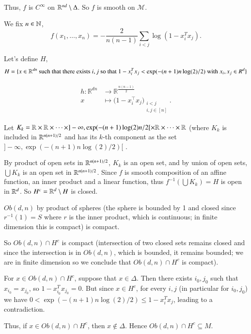 \documentclass{article}
\begin{document}
Thus, \( f \) is \( C^\infty \) on \( \mathbb{R}^{nd} \setminus \Delta \). So \( f \) is smooth on $\mathcal{M}$.

We fix \( n \in \mathbb{N} \),
\[
f(x_1, \ldots, x_n) = -\frac{2}{n(n-1)} \sum_{i<j} \log(1-x_i^T x_j).
\]

Let's define \( H \),
\[
H = \{x \in \R^{dn} \text{ such that there exists } i,j \text{ so that } 1-x_i^T x_j < \exp(-(n+1)n\log(2)/2)\ \text{with $x_i, x_j \in R^d$} \}
\]

\begin{align}
    h: \mathbb{R}^{dn} &\to \mathbb{R}^{\frac{n(n-1)}{2}} \\
    x &\mapsto \big(1 - x_i^\top x_j \big)_{\substack{i<j \\ i,j \in [n]}}.
\end{align}


Let \( K_k = \mathbb{R} \times \mathbb{R} \times \cdots \times ]-\infty, \exp(-(n+1)\log(2)n/2[ \times \mathbb{R} \times \cdots \times \mathbb{R} \) (where \( K_k \) is included in \( \mathbb{R}^{n(n+1)/2} \) and has its \( k \)-th component as the set \( ]-\infty, \exp(-(n+1)n\log(2)/2)\)[ . 

By product of open sets in \( \mathbb{R}^{n(n+1)/2} \), \( K_k \) is an open set, and by union of open sets, \( \bigcup K_k \) is an open set in \( \mathbb{R}^{n(n+1)/2} \). Since \( f \) is smooth composition of an affine function, an inner product and a linear function, thus \( f^{-1}(\bigcup K_k) = H \) is open in \( \mathbb{R}^d \). So \( H^c = \mathbb{R}^d \setminus H \) is closed.

\( Ob(d,n) \) by product of spheres (the sphere is bounded by 1 and closed since \( r^{-1}(1) = S \) where \( r \) is the inner product, which is continuous; in finite dimension this is compact) is compact.

So \( Ob(d,n) \cap H^c \) is compact (intersection of two closed sets remains closed and since the intersection is in \( Ob(d,n) \), which is bounded, it remains bounded; we are in finite dimension so we conclude that \( Ob(d,n) \cap H^c \) is compact).

For \( x \in Ob(d,n) \cap H^c \), suppose that \( x \in \Delta \). Then there exists \( i_0,j_0 \) such that \( x_{i_0} = x_{j_0} \), so \( 1-x_{i_0}^T x_{j_0} = 0 \). But since \( x \in H^c \), for every \( i,j \) (in particular for \( i_0,j_0 \)) we have  \( 0< \exp(-(n+1)n\log(2)/2) \leq 1 - x_i^T x_j \), leading to a contradiction. 

Thus, if \( x \in Ob(d,n) \cap H^c \), then \( x \notin \Delta \). Hence \( Ob(d,n) \cap H^c \subseteq M \).
\end{document}
